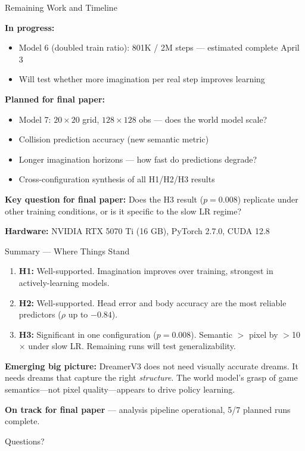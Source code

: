 \documentclass[aspectratio=169]{beamer}
\begin{document}
\begin{frame}{Remaining Work and Timeline}

\textbf{In progress:}
\begin{itemize}
    \item Model 6 (doubled train ratio): 801K / 2M steps --- estimated complete April 3
    \item Will test whether more imagination per real step improves learning
\end{itemize}

\vspace{0.5em}
\textbf{Planned for final paper:}
\begin{itemize}
    \item Model 7: $20 \times 20$ grid, $128 \times 128$ obs --- does the world model scale?
    \item Collision prediction accuracy (new semantic metric)
    \item Longer imagination horizons --- how fast do predictions degrade?
    \item Cross-configuration synthesis of all H1/H2/H3 results
\end{itemize}

\vspace{0.5em}
\textbf{Key question for final paper:} Does the H3 result ($p = 0.008$) replicate under other training conditions, or is it specific to the slow LR regime?

\vspace{0.5em}
\textbf{Hardware:} NVIDIA RTX 5070 Ti (16 GB), PyTorch 2.7.0, CUDA 12.8
\end{frame}

\begin{frame}{Summary --- Where Things Stand}

\begin{enumerate}
    \item \textbf{H1:} Well-supported. Imagination improves over training, strongest in actively-learning models.
    \item \textbf{H2:} Well-supported. Head error and body accuracy are the most reliable predictors ($\rho$ up to $-0.84$).
    \item \textbf{H3:} Significant in one configuration ($p = 0.008$). Semantic $>$ pixel by $>$10$\times$ under slow LR. Remaining runs will test generalizability.
\end{enumerate}

\vspace{0.5em}
\textbf{Emerging big picture:} DreamerV3 does not need visually accurate dreams. It needs dreams that capture the right \textit{structure}. The world model's grasp of game semantics---not pixel quality---appears to drive policy learning.

\vspace{0.5em}
\textbf{On track for final paper} --- analysis pipeline operational, 5/7 planned runs complete.

\end{frame}

\begin{frame}{}
\centering
\Huge Questions?
\end{frame}
\end{document}

